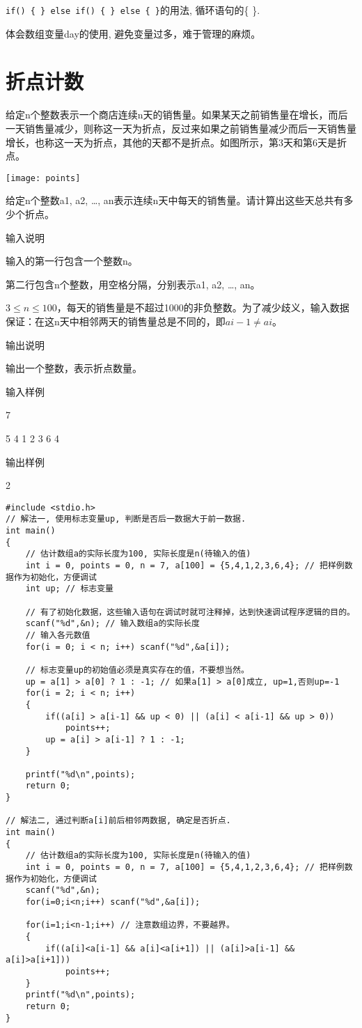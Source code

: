 \begin{note}[要点]
	\lstinline|if() { } else if() { } else { }|的用法, 循环语句的\{ \}.
	
	体会数组变量day的使用, 避免变量过多，难于管理的麻烦。
\end{note}

\section{折点计数}	
给定n个整数表示一个商店连续n天的销售量。如果某天之前销售量在增长，而后一天销售量减少，则称这一天为折点，反过来如果之前销售量减少而后一天销售量增长，也称这一天为折点，其他的天都不是折点。如图所示，第3天和第6天是折点。

\texttt{[image: points]}

给定n个整数a1, a2, \dots, an表示连续n天中每天的销售量。请计算出这些天总共有多少个折点。

输入说明
	
输入的第一行包含一个整数n。

第二行包含n个整数，用空格分隔，分别表示a1, a2, \dots, an。

$3\le n\le 100$，每天的销售量是不超过1000的非负整数。为了减少歧义，输入数据保证：在这n天中相邻两天的销售量总是不同的，即$ai-1\ne ai$。

输出说明	

输出一个整数，表示折点数量。

输入样例	

7

5 4 1 2 3 6 4

输出样例
	
2

\begin{lstlisting}
#include <stdio.h>
// 解法一, 使用标志变量up, 判断是否后一数据大于前一数据.
int main()
{
    // 估计数组a的实际长度为100, 实际长度是n(待输入的值)
	int i = 0, points = 0, n = 7, a[100] = {5,4,1,2,3,6,4}; // 把样例数据作为初始化，方便调试
	int up; // 标志变量 
	
	// 有了初始化数据，这些输入语句在调试时就可注释掉，达到快速调试程序逻辑的目的。
	scanf("%d",&n); // 输入数组a的实际长度
	// 输入各元数值
	for(i = 0; i < n; i++) scanf("%d",&a[i]);
	
	// 标志变量up的初始值必须是真实存在的值，不要想当然。
	up = a[1] > a[0] ? 1 : -1; // 如果a[1] > a[0]成立, up=1,否则up=-1
	for(i = 2; i < n; i++)
	{
		if((a[i] > a[i-1] && up < 0) || (a[i] < a[i-1] && up > 0))
			points++;
		up = a[i] > a[i-1] ? 1 : -1;
	}
	
	printf("%d\n",points);
	return 0;
} 

// 解法二, 通过判断a[i]前后相邻两数据, 确定是否折点. 
int main()
{
	// 估计数组a的实际长度为100, 实际长度是n(待输入的值)
	int i = 0, points = 0, n = 7, a[100] = {5,4,1,2,3,6,4}; // 把样例数据作为初始化，方便调试
	scanf("%d",&n);
	for(i=0;i<n;i++) scanf("%d",&a[i]);
	
	for(i=1;i<n-1;i++) // 注意数组边界，不要越界。 
	{
		if((a[i]<a[i-1] && a[i]<a[i+1]) || (a[i]>a[i-1] && a[i]>a[i+1]))
			points++;
	}
	printf("%d\n",points);
	return 0;
}
\end{lstlisting}


